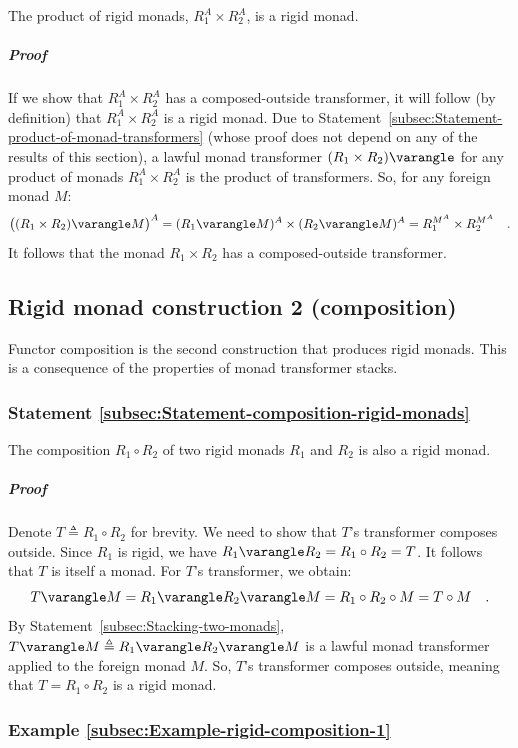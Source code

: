 The product of rigid monads, $R_{1}^{A}\times R_{2}^{A}$, is a rigid
monad.

\subparagraph{Proof}

If we show that $R_{1}^{A}\times R_{2}^{A}$ has a composed-outside
transformer, it will follow (by definition) that $R_{1}^{A}\times R_{2}^{A}$
is a rigid monad. Due to Statement~\ref{subsec:Statement-product-of-monad-transformers}
(whose proof does not depend on any of the results of this section),
a lawful monad transformer $(R_{1}\times R_{2})\varangle$ for any
product of monads $R_{1}^{A}\times R_{2}^{A}$ is the product of transformers.
So, for any foreign monad $M$:
\[
\big((R_{1}\times R_{2})\varangle M\big)^{A}=(R_{1}\varangle M)^{A}\times(R_{2}\varangle M)^{A}=R_{1}^{M^{A}}\times R_{2}^{M^{A}}\quad.
\]
It follows that the monad $R_{1}\times R_{2}$ has a composed-outside
transformer.

\subsection{Rigid monad construction 2 (composition)}

Functor composition is the second construction that produces rigid
monads. This is a consequence of the properties of monad transformer
stacks.

\subsubsection{Statement \label{subsec:Statement-composition-rigid-monads}\ref{subsec:Statement-composition-rigid-monads}}

The composition $R_{1}\circ R_{2}$ of two rigid monads $R_{1}$ and
$R_{2}$ is also a rigid monad.

\subparagraph{Proof}

Denote $T\triangleq R_{1}\circ R_{2}$ for brevity. We need to show
that $T$\textsf{'}s transformer composes outside. Since $R_{1}$ is rigid,
we have $R_{1}\varangle R_{2}=R_{1}\circ R_{2}=T$. It follows that
$T$ is itself a monad. For $T$\textsf{'}s transformer, we obtain:
\[
T\varangle M=R_{1}\varangle R_{2}\varangle M=R_{1}\circ R_{2}\circ M=T\circ M\quad.
\]
By Statement~\ref{subsec:Stacking-two-monads}, $T\varangle M\triangleq R_{1}\varangle R_{2}\varangle M$
is a lawful monad transformer applied to the foreign monad $M$. So,
$T$\textsf{'}s transformer composes outside, meaning that $T=R_{1}\circ R_{2}$
is a rigid monad.

\subsubsection{Example \label{subsec:Example-rigid-composition-1}\ref{subsec:Example-rigid-composition-1}}

